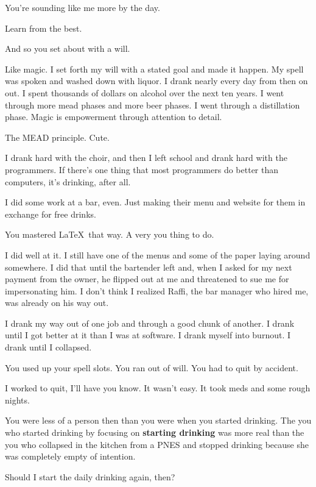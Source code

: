 \begin{paracol}{2}
\begin{leftcolumn}
\begin{ally}
You're sounding like me more by the day.
\end{ally}
Learn from the best.

\begin{ally}
And so you set about with a will.
\end{ally}
Like magic. I set forth my will with a stated goal and made it happen. My spell was spoken and washed down with liquor. I drank nearly every day from then on out. I spent thousands of dollars on alcohol over the next ten years. I went through more mead phases and more beer phases. I went through a distillation phase. Magic is empowerment through attention to detail.

\begin{ally}
The MEAD principle. Cute.
\end{ally}
I drank hard with the choir, and then I left school and drank hard with the programmers. If there's one thing that most programmers do better than computers, it's drinking, after all.

I did some work at a bar, even. Just making their menu and website for them in exchange for free drinks.

\begin{ally}
You mastered \LaTeX\ that way. A very you thing to do.
\end{ally}
I did well at it. I still have one of the menus and some of the paper laying around somewhere. I did that until the bartender left and, when I asked for my next payment from the owner, he flipped out at me and threatened to sue me for impersonating him. I don't think I realized Raffi, the bar manager who hired me, was already on his way out.

I drank my way out of one job and through a good chunk of another. I drank until I got better at it than I was at software. I drank myself into burnout. I drank until I collapsed.

\begin{ally}
You used up your spell slots. You ran out of will. You had to quit by accident.
\end{ally}
I worked to quit, I'll have you know. It wasn't easy. It took meds and some rough nights.

\begin{ally}
You were less of a person then than you were when you started drinking. The you who started drinking by focusing on \textbf{starting drinking} was more real than the you who collapsed in the kitchen from a PNES and stopped drinking because she was completely empty of intention.
\end{ally}
Should I start the daily drinking again, then?


\end{leftcolumn}
\end{paracol}
